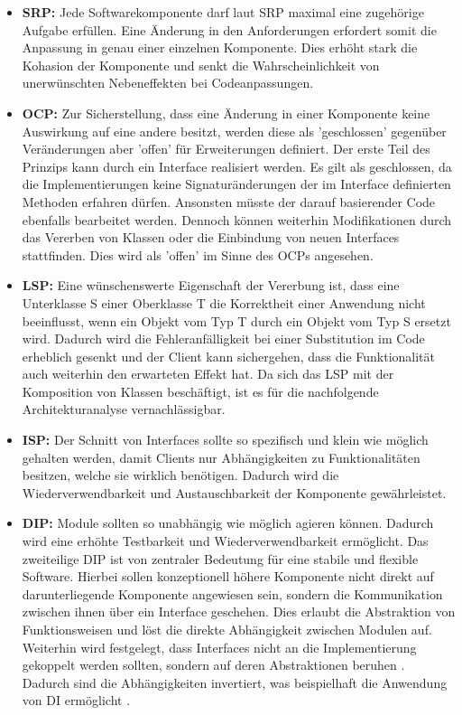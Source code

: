 \begin{itemize}[]
	\item \textbf{\acrlong{SRP}: } {Jede Softwarekomponente darf laut SRP maximal eine zugehörige Aufgabe erfüllen. Eine Änderung in den Anforderungen erfordert somit die Anpassung in genau einer einzelnen Komponente. Dies erhöht stark die \Gls{Kohasion} der Komponente und senkt die Wahrscheinlichkeit von unerwünschten Nebeneffekten bei Codeanpassungen. \cite{Martin.SRP, Martin.2018}}
	\item \textbf{\acrlong{OCP}: } {Zur Sicherstellung, dass eine Änderung in einer Komponente keine Auswirkung auf eine andere besitzt, werden diese als 'geschlossen' gegenüber Veränderungen aber 'offen' für Erweiterungen definiert. Der erste Teil des Prinzips kann durch ein Interface realisiert werden. Es gilt als geschlossen, da die Implementierungen keine Signaturänderungen der im Interface definierten Methoden erfahren dürfen. Ansonsten müsste der darauf basierender Code ebenfalls bearbeitet werden. Dennoch können weiterhin Modifikationen durch das Vererben von Klassen oder die Einbindung von neuen Interfaces stattfinden. Dies wird als 'offen' im Sinne des OCPs angesehen. \cite{Martin.2018, Meyer.2009}}
	\item \textbf{\acrlong{LSP}: } {Eine wünschenswerte Eigenschaft der Vererbung ist, dass eine Unterklasse S einer Oberklasse T die Korrektheit einer Anwendung nicht beeinflusst, wenn ein Objekt vom Typ T durch ein Objekt vom Typ S ersetzt wird. Dadurch wird die Fehleranfälligkeit bei einer Substitution im Code erheblich gesenkt und der Client kann sichergehen, dass die Funktionalität auch weiterhin den erwarteten Effekt hat. Da sich das LSP mit der Komposition von Klassen beschäftigt, ist es für die nachfolgende Architekturanalyse vernachlässigbar. \cite{Martin.2018, Liskov.1994}}
	\item \textbf{\acrlong{ISP}: } {Der Schnitt von Interfaces sollte so spezifisch und klein wie möglich gehalten werden, damit Clients nur Abhängigkeiten zu Funktionalitäten besitzen, welche sie wirklich benötigen. Dadurch wird die Wiederverwendbarkeit und Austauschbarkeit der Komponente gewährleistet. \cite{Martin.2018}\cite[S. 135ff.]{Martin.2003}}
	\item \textbf{\acrlong{DIP}: } {Module sollten so unabhängig wie möglich agieren können. Dadurch wird eine erhöhte Testbarkeit und Wiederverwendbarkeit ermöglicht. Das zweiteilige DIP ist von zentraler Bedeutung für eine stabile und flexible Software. Hierbei sollen konzeptionell höhere Komponente nicht direkt auf darunterliegende Komponente angewiesen sein, sondern die Kommunikation zwischen ihnen über ein Interface geschehen. Dies erlaubt die Abstraktion von Funktionsweisen und löst die direkte Abhängigkeit zwischen Modulen auf. Weiterhin wird festgelegt, dass Interfaces nicht an die Implementierung gekoppelt werden sollten, sondern auf deren Abstraktionen beruhen \cite{Martin.1996, Martin.2018}. Dadurch sind die Abhängigkeiten invertiert, was beispielhaft die Anwendung von \Gls{DI} ermöglicht \cite{Fowler.2004}.}
\end{itemize}

